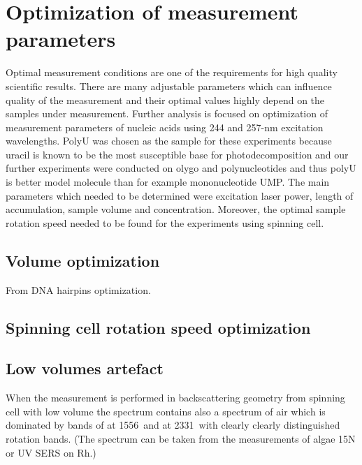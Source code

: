 \section{Optimization of measurement parameters}

Optimal measurement conditions are one of the requirements for high quality
scientific results. There are many adjustable parameters which can influence
quality of the measurement and their optimal values highly depend on the
samples under measurement. Further analysis is focused on optimization of
measurement parameters of nucleic acids using 244 and 257-nm excitation
wavelengths. PolyU was chosen as the sample for these experiments because
uracil is known to be the most susceptible base for photodecomposition and our
further experiments were conducted on olygo and polynucleotides and thus polyU
is better model molecule than for example mononucleotide UMP. The main
parameters which needed to be determined were excitation laser power, length of
accumulation, sample volume and concentration. Moreover, the optimal sample
rotation speed needed to be found for the experiments using spinning cell.




\subsection{Volume optimization}
From DNA hairpins optimization.




\subsection{Spinning cell rotation speed optimization}
\subsection{Low volumes artefact}
When the measurement is performed in backscattering geometry from spinning cell
with low volume the spectrum contains also a spectrum of air which is dominated
by bands of  at 1556\,\icm{} and  at 2331\,\icm{} with clearly
clearly distinguished rotation bands. (The spectrum can be taken from the
measurements of algae 15N or UV SERS on Rh.)
